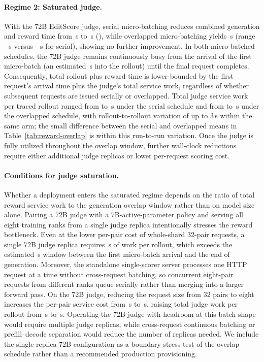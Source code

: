 \paragraph{Regime 2: Saturated judge.}
With the 72B EditScore judge, serial micro-batching reduces combined generation and reward time from \RSLargeBase{}\,s to \RSLargeSerial{}\,s (\RSLargeSerialSaving{}), while overlapped micro-batching yields \RSLargeOverlap{}\,s (range \RSLargeOverlapMin{}--\RSLargeOverlapMax{}\,s versus \RSLargeSerialMin{}--\RSLargeSerialMax{}\,s for serial), showing no further improvement.
In both micro-batched schedules, the 72B judge remains continuously busy from the arrival of the first micro-batch (an estimated \RSLargeFirstArrival{}\,s into the rollout) until the final request completes.
Consequently, total rollout plus reward time is lower-bounded by the first request's arrival time plus the judge's total service work, regardless of whether subsequent requests are issued serially or overlapped.
Total judge service work per traced rollout ranged from \RSLargeSerialWorkMin{} to \RSLargeSerialWorkMax{}\,s under the serial schedule and from \RSLargeOverlapWorkMin{} to \RSLargeOverlapWorkMax{}\,s under the overlapped schedule, with rollout-to-rollout variation of up to 3\,s within the same arm; the small difference between the serial and overlapped means in Table~\ref{tab:reward-overlap} is within this run-to-run variation.
Once the judge is fully utilized throughout the overlap window, further wall-clock reductions require either additional judge replicas or lower per-request scoring cost.

\paragraph{Conditions for judge saturation.}
Whether a deployment enters the saturated regime depends on the ratio of total reward service work to the generation overlap window rather than on model size alone.
Pairing a 72B judge with a 7B-active-parameter policy and serving all eight training ranks from a single judge replica intentionally stresses the reward bottleneck.
Even at the lower per-pair cost of whole-shard 32-pair requests, a single 72B judge replica requires \RSLargeWholeWork{}\,s of work per rollout, which exceeds the estimated \RSLargeWindow{}\,s window between the first micro-batch arrival and the end of generation.
Moreover, the standalone single-scorer server processes one HTTP request at a time without cross-request batching, so concurrent eight-pair requests from different ranks queue serially rather than merging into a larger forward pass.
On the 72B judge, reducing the request size from 32 pairs to eight increases the per-pair service cost from \RSLargeWholePerPair{}\,s to \RSLargeMicroPerPair{}\,s, raising total judge work per rollout from \RSLargeWholeWork{}\,s to \RSLargeSerialWork{}\,s.
Operating the 72B judge with headroom at this batch shape would require multiple judge replicas, while cross-request continuous batching or prefill--decode separation would reduce the number of replicas needed.
We include the single-replica 72B configuration as a boundary stress test of the overlap schedule rather than a recommended production provisioning.

